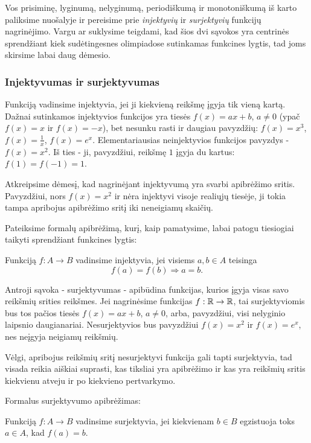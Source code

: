 Vos prisiminę, lyginumą, nelyginumą, periodiškumą ir monotoniškumą iš karto
paliksime nuošalyje ir pereisime prie \emph{injektyvių} ir
\emph{surjektyvių} funkcijų nagrinėjimo. Vargu ar suklysime teigdami, kad
šios dvi sąvokos yra centrinės sprendžiant kiek sudėtingesnes olimpiadose
sutinkamas funkcines lygtis, tad joms skirsime labai daug dėmesio.

\subsubsection{Injektyvumas ir surjektyvumas}

Funkciją vadinsime injektyvia, jei ji kiekvieną reikšmę įgyja tik vieną
kartą. Dažnai sutinkamos injektyvios funkcijos yra tiesės $f(x)=ax +
b$, $a\neq 0$ (ypač $f(x)=x$ ir $f(x)=-x$), bet nesunku rasti ir daugiau pavyzdžių:
$f(x)=x^3$, $f(x)=\frac{1}{x}$, $f(x)=e^{x}$. Elementariausias
neinjektyvios funkcijos pavyzdys - $f(x)=x^2$. Iš ties - ji, pavyzdžiui,
reikšmę $1$ įgyja du kartus: $f(1)=f(-1)=1$.

Atkreipsime dėmesį, kad nagrinėjant injektyvumą yra svarbi apibrėžimo
sritis. Pavyzdžiui, nors $f(x)=x^2$ ir nėra injektyvi visoje realiųjų
tiesėje, ji tokia tampa apribojus apibrėžimo sritį iki neneigiamų skaičių.

Pateiksime formalų apibrėžimą, kurį, kaip pamatysime, labai patogu
tiesiogiai taikyti sprendžiant funkcines lygtis:

\begin{api}
Funkciją $f:A\to B$ vadinsime injektyvia, jei visiems $a,b \in A$ teisinga $$f(a)=f(b) \Rightarrow a=b.$$
\end{api}

Antroji sąvoka - surjektyvumas - apibūdina funkcijas, kurios įgyja visas
savo reikšmių srities reikšmes. Jei nagrinėsime funkcijas $f:\mathbb R \to \mathbb R$,
tai surjektyviomis bus tos pačios tiesės $f(x)=ax +b$, $a\neq 0$, arba,
pavyzdžiui, visi nelyginio laipsnio daugianariai. Nesurjektyvios bus
pavyzdžiui $f(x)=x^2$ ir $f(x)=e^x$, nes neįgyja neigiamų reikšmių.

Vėlgi, apribojus reikšmių sritį nesurjektyvi funkcija gali tapti
surjektyvia, tad visada reikia aiškiai suprasti, kas tiksliai yra
apibrėžimo ir kas yra reikšmių sritis kiekvienu atveju ir po kiekvieno
pertvarkymo.

Formalus surjektyvumo apibrėžimas:

\begin{api}
Funkciją $f:A\to B$ vadinsime surjektyvia, jei kiekvienam $b\in B$
egzistuoja toks $a\in A$, kad $f(a)=b$.
\end{api}

